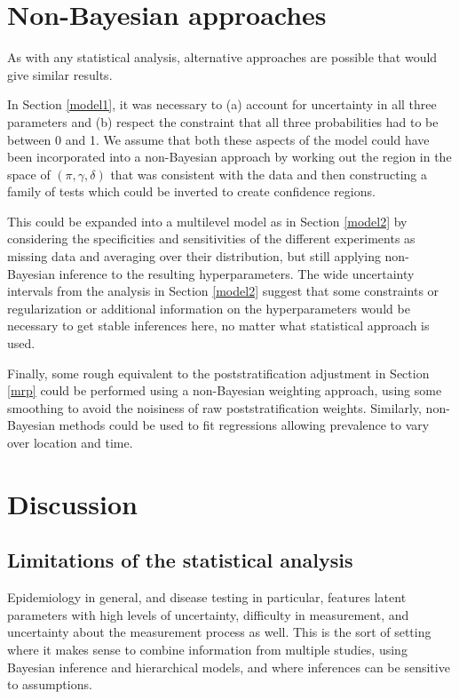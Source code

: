 \documentclass[11pt]{article}
\begin{document}
\section{Non-Bayesian approaches}
As with any statistical analysis, alternative approaches are possible that would give similar results.

In Section \ref{model1}, it was necessary to (a) account for uncertainty in all three parameters and (b) respect the constraint that all three probabilities had to be between 0 and 1.  We assume that both these aspects of the model could have been incorporated into a non-Bayesian approach by working out the region in the space of $(\pi,\gamma,\delta)$ that was consistent with the data and then constructing a family of tests which could be inverted to create confidence regions.

This could be expanded into a multilevel model as in Section \ref{model2} by considering the specificities and sensitivities of the different experiments as missing data and averaging over their distribution, but still applying non-Bayesian inference to the resulting hyperparameters.  The wide uncertainty intervals from the analysis in Section \ref{model2} suggest that some constraints or regularization or additional information on the hyperparameters would be necessary to get stable inferences here, no matter what statistical approach is used.

Finally, some rough equivalent to the poststratification adjustment in Section \ref{mrp} could be performed using a non-Bayesian weighting approach, using some smoothing to avoid the noisiness of raw poststratification weights.  Similarly, non-Bayesian methods could be used to fit regressions allowing prevalence to vary over location and time.

\section{Discussion}


\subsection{Limitations of the statistical analysis}


Epidemiology in general, and disease testing in particular, features latent parameters with high levels of uncertainty, difficulty in measurement, and uncertainty about the measurement process as well.  This is the sort of setting where it makes sense to combine information from multiple studies, using Bayesian inference and hierarchical models, and where inferences can be sensitive to assumptions.
\end{document}
